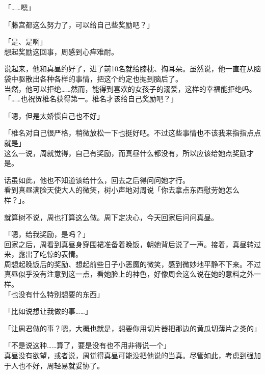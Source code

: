 「……嗯」

「藤宫都这么努力了，可以给自己些奖励吧？」

「是、是啊」\\

想起奖励这回事，周感到心痒难耐。

说起来，他和真昼约好了，进了前10名就给膝枕、掏耳朵。虽然说，他一直在从脑袋中驱散出各种各样的事情，把这个约定也抛到脑后了。\\

当然，他可以拒绝……然而，能得到喜欢的女孩子的溺爱，这样的幸福能拒绝吗。\\

「……也祝贺椎名获得第一。椎名才该给自己奖励吧？」

「嗯，但是太娇惯自己也不好」

「椎名对自己很严格，稍微放松一下也挺好吧。不过这些事情也不该我来指指点点就是」\\

这么一说，周就觉得，自己有奖励，而真昼什么都没有，所以应该给她点奖励才是。

话虽如此，他也不知道该给什么，回去之后得问问她才行。\\

看到真昼满脸天使大人的微笑，树小声地对周说「你去拿点东西慰劳她怎么样？」。

就算树不说，周也打算这么做。周下定决心，今天回家后问问真昼。\\

\vspace{2\baselineskip}

「嗯，给我奖励，是吗？」\\

回家之后，周看到真昼身穿围裙准备着晚饭，朝她背后说了一声。接着，真昼转过来，露出了吃惊的表情。\\

周想起晚饭后的奖励、想起前些日子小恶魔的微笑，感到微妙地平静不下来。不过真昼似乎没有注意到这一点，看她脸上的神色，好像周会这么说在她的意料之外一样。\\

「也没有什么特别想要的东西」

「比如说想让我做的事……」

「让周君做的事？嗯，大概也就是，想要你用切片器把那边的黄瓜切薄片之类的」

「不是说这种……算了，要是没有也不用非得说一个」\\

真昼没有欲望，或者说，周觉得真昼可能没把他说的当真。尽管如此，考虑到强加于人也不好，周轻易就妥协了。\\

